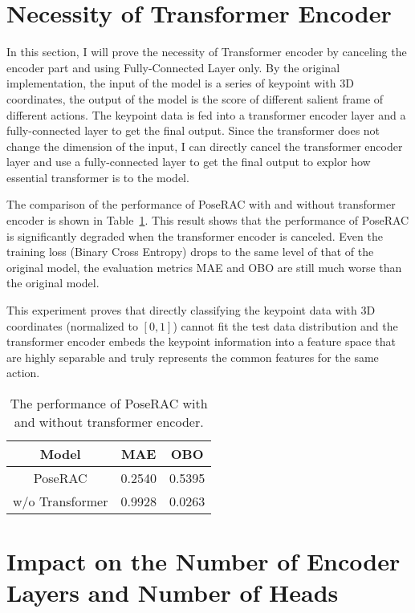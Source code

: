 \documentclass[10pt,twocolumn,letterpaper]{article}
\begin{document}


    \section{Necessity of Transformer Encoder}
    \label{sec:necessity}

    In this section, I will prove the necessity of Transformer encoder by canceling the encoder part and using Fully-Connected Layer only.
    By the original implementation, the input of the model is a series of keypoint with 3D coordinates, the output of the model is the
    score of different salient frame of different actions.
    The keypoint data is fed into a transformer encoder layer and a fully-connected layer to get the final output.
    Since the transformer does not change the dimension of the input, I can directly cancel the transformer encoder layer and use
    a fully-connected layer to get the final output to explor how essential transformer is to the model.

    The comparison of the performance of PoseRAC with and without transformer encoder is shown in Table~\ref{tab:w/o transformer}.
    This result shows that the performance of PoseRAC is significantly degraded when the transformer encoder is canceled.
    Even the training loss (Binary Cross Entropy) drops to the same level of that of the original model, the evaluation metrics
    MAE and OBO are still much worse than the original model.

    This experiment proves that directly classifying the keypoint data with 3D coordinates (normalized to $[0,1]$) cannot
    fit the test data distribution and the transformer encoder embeds the keypoint information into a feature space that
    are highly separable and truly represents the common features for the same action.

    \begin{table}
        \centering
        \begin{tabular}[H]{c c c}
            Model           & MAE    & OBO    \\
            \hline
            \hline
            PoseRAC         & 0.2540 & 0.5395 \\
            \hline
            w/o Transformer & 0.9928 & 0.0263 \\
        \end{tabular}
        \caption{The performance of PoseRAC with and without transformer encoder.}
        \label{tab:w/o transformer}
    \end{table}



    \section{Impact on the Number of Encoder Layers and Number of Heads}
    \label{sec:num_layers_num_heads}



        {\small
    
    
    }
\end{document}
